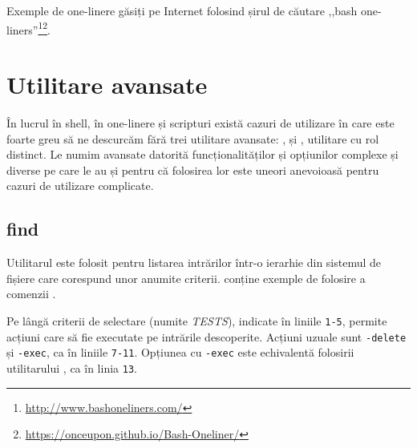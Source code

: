 Exemple de one-linere găsiți pe Internet folosind șirul de căutare ,,bash one-liners''\footnote{\url{http://www.bashoneliners.com/}}\footnote{\url{https://onceupon.github.io/Bash-Oneliner/}}.

\section{Utilitare avansate}
\label{sec:cli:advanced}

În lucrul în shell, în one-linere și scripturi există cazuri de utilizare în
care este foarte greu să ne descurcăm fără trei utilitare avansate: ,  și
, utilitare cu rol distinct. Le numim avansate datorită funcționalităților și
opțiunilor complexe și diverse pe care le au și pentru că folosirea lor este
uneori anevoioasă pentru cazuri de utilizare complicate.

\subsection{find}
\label{sec:cli:advanced:find}

Utilitarul  este folosit pentru listarea intrărilor într-o ierarhie din
sistemul de fișiere care corespund unor anumite criterii.  conține exemple de folosire a comenzii .


Pe lângă criterii de selectare (numite \textit{TESTS}), indicate în liniile \texttt{1-5},  permite acțiuni care să fie
executate pe intrările descoperite. Acțiuni uzuale sunt \texttt{-delete} și \texttt{-exec}, ca în liniile \texttt{7-11}. Opțiunea cu \texttt{-exec} este echivalentă folosirii utilitarului , ca în linia \texttt{13}.

